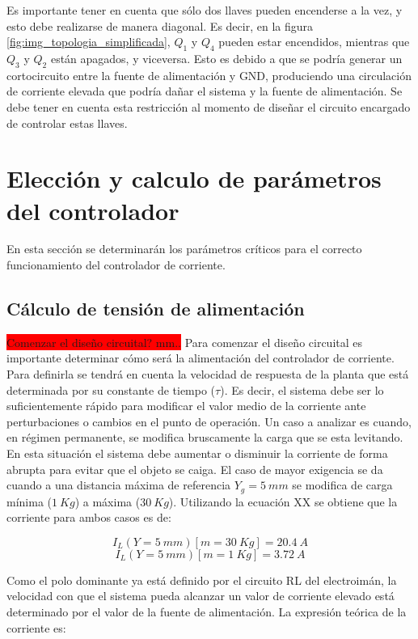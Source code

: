 Es importante tener en cuenta que sólo dos llaves pueden encenderse a la vez, y esto debe realizarse de manera diagonal. Es decir, en la figura \ref{fig:img_topologia_simplificada}, $Q_1$ y $Q_4$ pueden estar encendidos, mientras que $Q_3$ y $Q_2$ están apagados, y viceversa. Esto es debido a que se podría generar un cortocircuito entre la fuente de alimentación y GND, produciendo una circulación de corriente elevada que podría dañar el sistema y la fuente de alimentación. Se debe tener en cuenta esta restricción al momento de diseñar el circuito encargado de controlar estas llaves.



\section{Elección y calculo de parámetros del controlador}
En esta sección se determinarán los parámetros críticos para el correcto funcionamiento del controlador de corriente.
\subsection{Cálculo de tensión de alimentación}
\colorbox{red}{Comenzar el diseño circuital? mm..}
Para comenzar el diseño circuital es importante determinar cómo será la alimentación del controlador de corriente. Para definirla se tendrá en cuenta la velocidad de respuesta de la planta que está determinada por su constante de tiempo ($\tau$). Es decir, el sistema debe ser lo suficientemente rápido para modificar el valor medio de la corriente ante perturbaciones o cambios en el punto de operación. Un caso a analizar es cuando, en régimen permanente, se modifica bruscamente la carga que se esta levitando. En esta situación el sistema debe aumentar o disminuir la corriente de forma abrupta para evitar que el objeto se caiga. El caso de mayor exigencia se da cuando a una distancia máxima de referencia $Y_g=5\:mm$ se modifica de carga mínima ($1\:Kg$) a máxima ($30\:Kg$). Utilizando la ecuación XX se obtiene que la corriente para ambos casos es de:

\begin{equation}
	I_L(Y=5\:mm)[m=30\:Kg]=20.4\:A 
\end{equation}
\begin{equation}
	I_L(Y=5\:mm)[m=1\:Kg]=3.72\:A
\end{equation}

Como el polo dominante ya está definido por el circuito RL del electroimán, la velocidad con que el sistema pueda alcanzar un valor de corriente elevado está determinado por el valor de la fuente de alimentación. La expresión teórica de la corriente es: 

